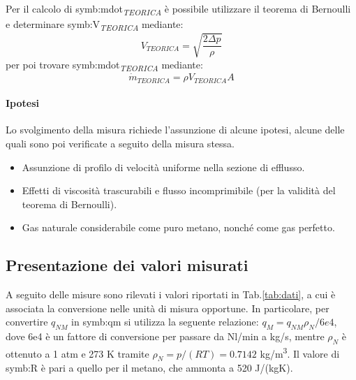 Per il calcolo di \gls{symb:mdot}\textsubscript{\textit{TEORICA}} è possibile utilizzare il teorema di Bernoulli e determinare \gls{symb:V}\textsubscript{\textit{TEORICA}} mediante: 
\begin{equation}
	V_{\textit{TEORICA}} = \sqrt{\frac{2\Delta p}{\rho}} \label{eq:velocità}
\end{equation}
per poi trovare \gls{symb:mdot}\textsubscript{\textit{TEORICA}} mediante:
\begin{equation}
	\dot{m}_{\textit{TEORICA}}=\rho	V_{\textit{TEORICA}} A \label{eq:portata}
\end{equation}


\paragraph{Ipotesi}
Lo svolgimento della misura richiede l'assunzione di alcune ipotesi, alcune delle quali sono poi verificate a seguito della misura stessa. 

\begin{itemize}
	\item Assunzione di profilo di velocità uniforme nella sezione di efflusso.
	\item Effetti di viscosità trascurabili e flusso incomprimibile (per la validità del teorema di Bernoulli).
	\item Gas naturale considerabile come puro metano, nonché come gas perfetto.
\end{itemize}

\subsection{Presentazione dei valori misurati}
A seguito delle misure sono rilevati i valori riportati in Tab.\ref{tab:dati}, a cui è associata la conversione nelle unità di misura opportune. In particolare, per convertire $q_{NM}$ in \gls{symb:qm} si utilizza la seguente relazione: $q_M=q_{NM} \rho_N /6e4$, dove 6e4 è un fattore di conversione per passare da Nl/min a kg/s, mentre $\rho_N$ è ottenuto a 1 atm e 273 K tramite $\rho_N = p/(RT) = 0.7142$ kg/m\textsuperscript{3}. Il valore di \gls{symb:R} è pari a quello per il metano, che ammonta a 520 J/(kgK).

